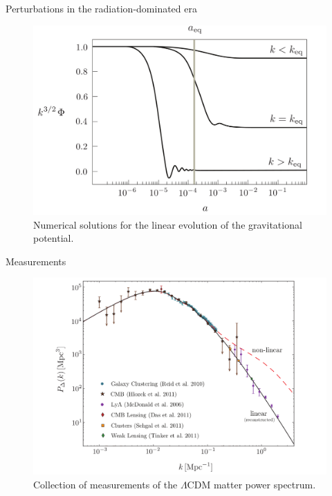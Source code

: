 \documentclass[10pt]{beamer}
\begin{document}
{%
\begin{frame}{Perturbations in the radiation-dominated era}
	\begin{figure}
		\centering
		\includegraphics[width=0.9 \textwidth]{PerturbationsRadiationEra.png}
		\caption{Numerical solutions for the linear evolution of the gravitational potential.}
	\end{figure}

\end{frame}
}
{%
\begin{frame}{Measurements}
\begin{figure}
	\centering
	\includegraphics[width=0.9 \textwidth]{MatterPowerSpectrumToday.png}
	\caption{Collection of measurements of the $\Lambda$CDM matter power spectrum.}
	
\end{figure}
\end{frame}
}
\end{document}
